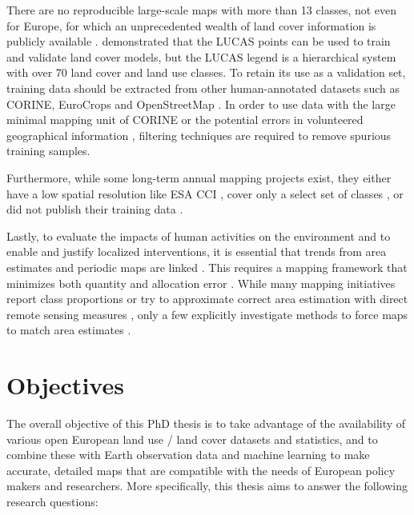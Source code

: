     There are no reproducible large-scale maps with more than 13 classes, not even for Europe, for which an unprecedented wealth of land cover information is publicly available \citep{dandrimont2020harmonised}. \citet{pflugmacher2019mapping} demonstrated that the LUCAS points can be used to train and validate land cover models, but the LUCAS legend is a hierarchical system with over 70 land cover and land use classes. To retain its use as a validation set, training data should be extracted from other human-annotated datasets such as CORINE, EuroCrops \citep{schneider2023eurocrops} and OpenStreetMap \citep{schultz2017open}. In order to use data with the large minimal mapping unit of CORINE or the potential errors in volunteered geographical information \citep{neis2014recent}, filtering techniques are required to remove spurious training samples.

    Furthermore, while some long-term annual mapping projects exist, they either have a low spatial resolution like ESA CCI \citep{harper202229}, cover only a select set of classes \citep{potapov2022global}, or did not publish their training data \citep{zhang2020glcfcs30}. 

    Lastly, to evaluate the impacts of human activities on the environment and to enable and justify localized interventions, it is essential that trends from area estimates and periodic maps are linked \citep{olofsson2014good,szantoi2020addressing,winkler2021global}. This requires a mapping framework that minimizes both quantity and allocation error \citep{pontius2011death}. While many mapping initiatives report class proportions \citep{pflugmacher2019mapping} or try to approximate correct area estimation with direct remote sensing measures \citep{kleinewillinghofer2022unbiased}, only a few explicitly investigate methods to force maps to match area estimates \citep{strahler1980use,horvath2021comparison}.
    

\section{Objectives}
\label{sec:research_objectives}
The overall objective of this PhD thesis is to take advantage of the availability of various open European land use / land cover datasets and statistics, and to combine these with Earth observation data and machine learning to make accurate, detailed maps that are compatible with the needs of European policy makers and researchers. More specifically, this thesis aims to answer the following research questions:

